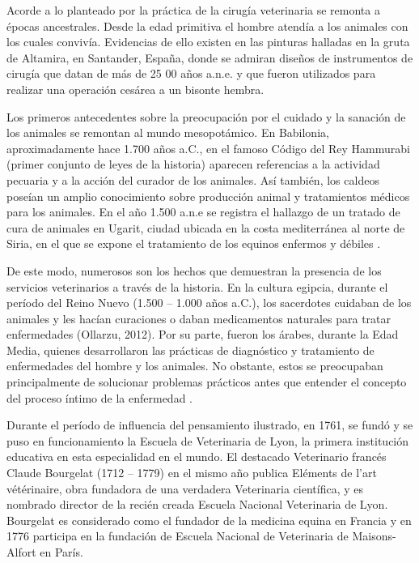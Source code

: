 Acorde a lo planteado por  la práctica de la cirugía veterinaria se remonta a épocas ancestrales. Desde la edad primitiva el hombre atendía a los animales con los cuales convivía. Evidencias de ello existen en las pinturas halladas en la gruta de Altamira, en Santander, España, donde se admiran diseños de instrumentos de cirugía que datan de más de 25 00 años a.n.e. y que fueron utilizados para realizar una operación cesárea a un bisonte hembra.   

Los primeros antecedentes sobre la preocupación por el cuidado y la sanación de los animales se remontan al mundo mesopotámico. En Babilonia, aproximadamente hace 1.700 años a.C., en el famoso Código del Rey Hammurabi (primer conjunto de leyes de la historia) aparecen referencias a la actividad pecuaria y a la acción del curador de los animales. Así también, los caldeos poseían un amplio conocimiento sobre producción animal y tratamientos médicos para los animales. En el año 1.500 a.n.e se registra el hallazgo de un tratado de cura de animales en Ugarit, ciudad ubicada en la costa mediterránea al norte de Siria, en el que se expone el tratamiento de los equinos enfermos y débiles . 

De este modo, numerosos son los hechos que demuestran la presencia de los servicios veterinarios a través de la historia. En la cultura egipcia, durante el período del Reino Nuevo (1.500 – 1.000 años a.C.), los sacerdotes cuidaban de los animales y les hacían curaciones o daban medicamentos naturales para tratar enfermedades (Ollarzu, 2012). Por su parte, fueron los árabes, durante la Edad Media, quienes desarrollaron las prácticas de diagnóstico y tratamiento de enfermedades del hombre y los animales. No obstante, estos se preocupaban principalmente de solucionar problemas prácticos antes que entender el concepto del proceso íntimo de la enfermedad .  

Durante el período de influencia del pensamiento ilustrado, en 1761, se fundó y se puso en funcionamiento la Escuela de Veterinaria de Lyon, la primera institución educativa en esta especialidad en el mundo. El destacado Veterinario francés Claude Bourgelat (1712 – 1779) en el mismo año publica Eléments de l’art vétérinaire, obra fundadora de una verdadera Veterinaria científica, y es nombrado director de la recién creada Escuela Nacional Veterinaria de Lyon. Bourgelat es considerado como el fundador de la medicina equina en Francia y en 1776 participa en la fundación de Escuela Nacional de Veterinaria de Maisons-Alfort en París.  

